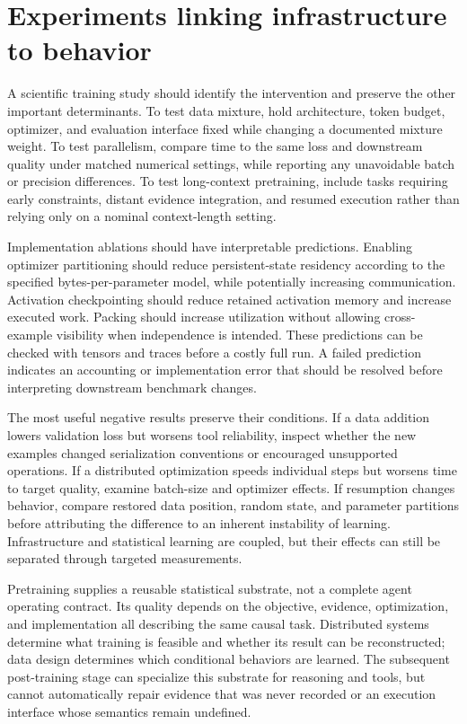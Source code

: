 \section{Experiments linking infrastructure to behavior}
\label{sec:C07:experiments}
A scientific training study should identify the intervention and preserve the other important determinants. To test data mixture, hold architecture, token budget, optimizer, and evaluation interface fixed while changing a documented mixture weight. To test parallelism, compare time to the same loss and downstream quality under matched numerical settings, while reporting any unavoidable batch or precision differences. To test long-context pretraining, include tasks requiring early constraints, distant evidence integration, and resumed execution rather than relying only on a nominal context-length setting.

Implementation ablations should have interpretable predictions. Enabling optimizer partitioning should reduce persistent-state residency according to the specified bytes-per-parameter model, while potentially increasing communication. Activation checkpointing should reduce retained activation memory and increase executed work. Packing should increase utilization without allowing cross-example visibility when independence is intended. These predictions can be checked with tensors and traces before a costly full run. A failed prediction indicates an accounting or implementation error that should be resolved before interpreting downstream benchmark changes.

The most useful negative results preserve their conditions. If a data addition lowers validation loss but worsens tool reliability, inspect whether the new examples changed serialization conventions or encouraged unsupported operations. If a distributed optimization speeds individual steps but worsens time to target quality, examine batch-size and optimizer effects. If resumption changes behavior, compare restored data position, random state, and parameter partitions before attributing the difference to an inherent instability of learning. Infrastructure and statistical learning are coupled, but their effects can still be separated through targeted measurements.

Pretraining supplies a reusable statistical substrate, not a complete agent operating contract. Its quality depends on the objective, evidence, optimization, and implementation all describing the same causal task. Distributed systems determine what training is feasible and whether its result can be reconstructed; data design determines which conditional behaviors are learned. The subsequent post-training stage can specialize this substrate for reasoning and tools, but cannot automatically repair evidence that was never recorded or an execution interface whose semantics remain undefined.

